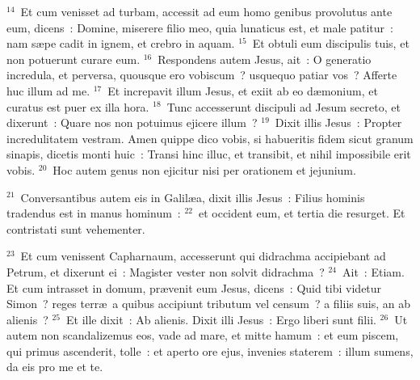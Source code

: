 ${}^{14}$~Et cum venisset ad turbam, accessit ad eum homo genibus provolutus ante eum, dicens~: Domine, miserere filio meo, quia lunaticus est, et male patitur~: nam s\ae pe cadit in ignem, et crebro in aquam.
${}^{15}$~Et obtuli eum discipulis tuis, et non potuerunt curare eum.
${}^{16}$~Respondens autem Jesus, ait~: O generatio incredula, et perversa, quousque ero vobiscum~? usquequo patiar vos~? Afferte huc illum ad me.
${}^{17}$~Et increpavit illum Jesus, et exiit ab eo d\ae monium, et curatus est puer ex illa hora.
${}^{18}$~Tunc accesserunt discipuli ad Jesum secreto, et dixerunt~: Quare nos non potuimus ejicere illum~?
${}^{19}$~Dixit illis Jesus~: Propter incredulitatem vestram. Amen quippe dico vobis, si habueritis fidem sicut granum sinapis, dicetis monti huic~: Transi hinc illuc, et transibit, et nihil impossibile erit vobis.
${}^{20}$~Hoc autem genus non ejicitur nisi per orationem et jejunium.


${}^{21}$~Conversantibus autem eis in Galil\ae a, dixit illis Jesus~: Filius hominis tradendus est in manus hominum~:
${}^{22}$~et occident eum, et tertia die resurget. Et contristati sunt vehementer.


${}^{23}$~Et cum venissent Capharnaum, accesserunt qui didrachma accipiebant ad Petrum, et dixerunt ei~: Magister vester non solvit didrachma~?
${}^{24}$~Ait~: Etiam. Et cum intrasset in domum, pr\ae venit eum Jesus, dicens~: Quid tibi videtur Simon~? reges terr\ae\ a quibus accipiunt tributum vel censum~? a filiis suis, an ab alienis~?
${}^{25}$~Et ille dixit~: Ab alienis. Dixit illi Jesus~: Ergo liberi sunt filii.
${}^{26}$~Ut autem non scandalizemus eos, vade ad mare, et mitte hamum~: et eum piscem, qui primus ascenderit, tolle~: et aperto ore ejus, invenies staterem~: illum sumens, da eis pro me et te.


